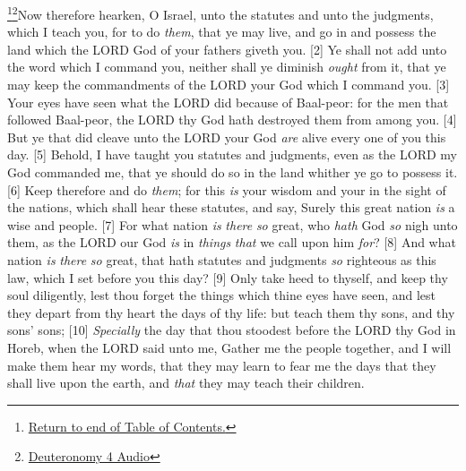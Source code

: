 \footnote{\textcolor[cmyk]{0.99998,1,0,0}{\hyperlink{TOC}{Return to end of Table of Contents.}}}\footnote{\href{https://audiobible.com/bible/deuteronomy_4.html}{\textcolor[cmyk]{0.99998,1,0,0}{Deuteronomy 4 Audio}}}\textcolor[cmyk]{0.99998,1,0,0}{Now therefore hearken, O Israel, unto the statutes and unto the judgments, which I teach you, for to do \emph{them}, that ye may live, and go in and possess the land which the LORD God of your fathers giveth you.}
[2] \textcolor[cmyk]{0.99998,1,0,0}{Ye shall not add unto the word which I   {command} you, neither shall ye diminish \emph{ought} from it, that ye may keep the commandments of the LORD your God which I command you.}
[3] \textcolor[cmyk]{0.99998,1,0,0}{Your eyes have seen what the LORD did because of Baal-peor: for  the men that followed Baal-peor, the LORD thy God hath destroyed them from among you.}
[4] \textcolor[cmyk]{0.99998,1,0,0}{But ye that did   {cleave} unto the LORD your God \emph{are} alive every one of you this day.}
[5] \textcolor[cmyk]{0.99998,1,0,0}{Behold, I have taught you statutes and judgments, even as the LORD my God commanded me, that ye should do so in the land whither ye go to possess it.}
[6] \textcolor[cmyk]{0.99998,1,0,0}{Keep therefore and do \emph{them}; for this \emph{is} your wisdom and your  in the sight of the nations, which shall hear  these statutes, and say, Surely this great nation \emph{is} a wise and  people.}
[7] \textcolor[cmyk]{0.99998,1,0,0}{For what nation \emph{is} \emph{there} \emph{so} great, who \emph{hath} God \emph{so} nigh unto them, as the LORD our God \emph{is} in  \emph{things} \emph{that} we call upon him \emph{for}?}
[8] \textcolor[cmyk]{0.99998,1,0,0}{And what nation \emph{is} \emph{there} \emph{so} great, that hath statutes and judgments \emph{so} righteous as  this law, which I set before you this day?}
[9] \textcolor[cmyk]{0.99998,1,0,0}{Only take heed to thyself, and keep thy soul diligently, lest thou forget the things which thine eyes have seen, and lest they depart from thy heart  the days of thy life: but teach them thy sons, and thy sons' sons;}
[10] \textcolor[cmyk]{0.99998,1,0,0}{\emph{Specially} the day that thou stoodest before the LORD thy God in Horeb, when the LORD said unto me, Gather me the people together, and I will make them hear my words, that they may learn to fear me  the days that they shall live upon the earth, and \emph{that} they may teach their children.}
